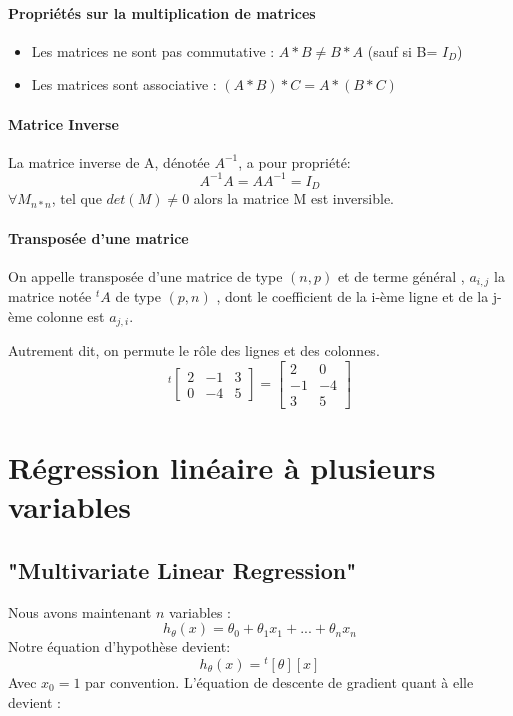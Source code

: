 \documentclass{article}
\theoremstyle{definition}
\begin{document}
\paragraph{Propriétés sur la multiplication de matrices}
\begin{itemize}
  \item Les matrices ne sont pas commutative : $A*B \ne B*A$ (sauf si B= $I_D$)
  \item Les matrices sont associative : $(A*B)*C = A*(B*C)$
\end{itemize}
\paragraph{Matrice Inverse}
La matrice inverse de A, dénotée $A^{-1}$, a pour propriété: 
\begin{equation}
A^{-1}A = AA^{-1} = I_D
\end{equation}
$\forall  M_{n*n}$, tel que $det(M) \neq 0$ alors la matrice M est inversible.
\paragraph{Transposée d'une matrice}
On appelle transposée d'une matrice de type $(n,p)$ et de terme général , $a_{i,j}$ la matrice notée ${^t}A$ de type $(p,n)$ , dont le coefficient de la i-ème ligne et de la j-ème colonne est $a_{j,i}$.\par Autrement dit, on permute le rôle des lignes et des colonnes.
\begin{equation}
{^t}
\begin{bmatrix} 
2 & -1 & 3 \\
0 & -4 & 5 
\end{bmatrix}
=
\begin{bmatrix} 
2 & 0\\
-1 & -4 \\
3 & 5
\end{bmatrix} 
\end{equation}
\newpage
\section{Régression linéaire à plusieurs variables}
\subsection{"Multivariate Linear Regression"}
Nous avons maintenant $n$ variables :
\begin{equation}
h_\theta(x) = \theta_0 + \theta_1 x_1 +...+\theta_n x_n
\end{equation}
Notre équation d'hypothèse devient:
\begin{equation}
h_\theta(x) = {^t}[\theta][x]
\end{equation}
Avec  $x_0=1$ par convention.
L'équation de descente de gradient quant à elle devient : 
\end{document}

